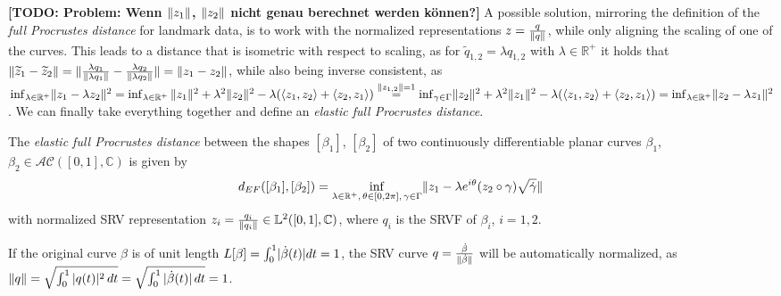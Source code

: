 \textbf{[TODO: Problem: Wenn $\lVert z_1\rVert$, $\lVert z_2\rVert$ nicht genau berechnet werden können?]} 
A possible solution, mirroring the definition of the \emph{full Procrustes distance} for landmark data, is to work with the normalized representations $z = \frac{q}{\lVert q\rVert}$, while only aligning the scaling of one of the curves.
This leads to a distance that is isometric with respect to scaling, as for $\widetilde{q}_{1,2} = \lambda q_{1,2}$ with $\lambda \in \mathbb{R}^+$ it holds that $\lVert\widetilde z_1 - \widetilde z_2\rVert = \lVert \frac{\lambda q_1}{\lVert\lambda q_1\rVert} - \frac{\lambda q_2}{\lVert\lambda q_2\rVert}\rVert = \lVert z_1 - z_2\rVert$, while also being inverse consistent, as $\inf_{\lambda \in \mathbb{R}^+} \lVert z_1 - \lambda z_2\rVert^2 = \inf_{\lambda \in \mathbb{R}^+}\,\lVert z_1\rVert^2 + \lambda^2 \lVert z_2\rVert^2 - \lambda (\langle z_1, z_2 \rangle + \langle z_2, z_1 \rangle) \overset{\lVert z_{1,2}\rVert = 1}{=} \inf_{\gamma \in \Gamma} \lVert z_2\rVert^2 + \lambda^2 \lVert z_1\rVert^2 - \lambda (\langle z_1, z_2 \rangle + \langle z_2, z_1 \rangle) = \inf_{\lambda \in \mathbb{R}^+} \lVert z_2 - \lambda z_1\rVert^2$.
We can finally take everything together and define an \emph{elastic full Procrustes distance}.
\begin{definition}
  \label{def:dist}
  The \emph{elastic full Procrustes distance} between the shapes $[\beta_1]$, $[\beta_2]$ of two continuously differentiable planar curves $\beta_1$, $\beta_2 \in \mathcal{AC}([0,1],\mathbb{C})$  is given by 
    $$d_{EF}([\beta_1], [\beta_2]) = \inf_{\lambda \in \mathbb{R}^+,\, \theta \in
    [0,2\pi],\, \gamma \in \Gamma} \lVert z_1 - \lambda e^{i\theta} (z_2 \circ \gamma) \sqrt{\dot\gamma}\rVert\, $$
    with normalized SRV representation $z_{i} = \frac{q_{i}}{\lVert q_{i}\rVert} \in \mathbb{L}^2([0,1], \mathbb{C})$, where $q_i$ is the SRVF of $\beta_i$, $i = 1,2$.
\end{definition}
\begin{remark}
  If the original curve $\beta$ is of unit length $L[\beta] = \int_0^1 \lvert\dot\beta(t)\rvert dt = 1$, the SRV curve $q = \frac{\dot\beta}{\lVert\dot\beta\rVert}$ will be automatically normalized, as $ \lVert q\rVert = \sqrt{ \int_0^1 |q(t)|^2 \, dt} = \sqrt{\int_0^1 |\dot{\beta}(t)| \, dt} = 1$.
\end{remark}

